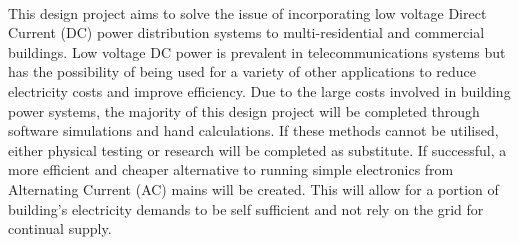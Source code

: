 \paragraph{}
This design project aims to solve the issue of incorporating low voltage Direct Current (DC) power distribution systems to multi-residential and commercial buildings. Low voltage DC power is prevalent in telecommunications systems but has the possibility of being used for a variety of other applications to reduce electricity costs and improve efficiency. Due to the large costs involved in building power systems, the majority of this design project will be completed through software simulations and hand calculations. If these methods cannot be utilised, either physical testing or research will be completed as substitute. If successful, a more efficient and cheaper alternative to running simple electronics from Alternating Current (AC) mains will be created. This will allow for a portion of building's electricity demands to be self sufficient and not rely on the grid for continual supply.   
 
\newpage
